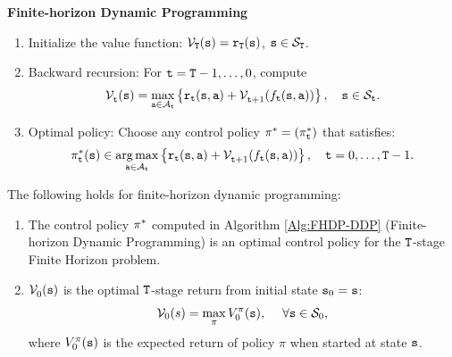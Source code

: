 \begin{algorithm_}
\label{Alg:FHDP-DDP} \textbf{Finite-horizon Dynamic Programming}
\begin{enumerate}
  \item Initialize the value function:
  $\mathcal{V}_{\tt T}({\tt s}) = {{\tt r}_{\tt T}}({\tt s})$,  ${\tt s} \in {\mathcal{S}_{\tt T}}$.
  \item Backward recursion:  For ${\tt t} = {\tt T} - 1, \ldots ,0$, compute
\[\mathcal{V}_{{\tt t}}^{}({\tt s}) = \mathop {\max }\limits_{{\tt a} \in {\mathcal{A}_{{\tt t}}}} \left\{ {{{\tt r}_{{\tt t}}}({\tt s},{\tt a}) + \mathcal{V}_{{\tt t} + 1}^{}({f_{{\tt t}}}({\tt s},{\tt a}))} \right\},\quad     {\tt s} \in {\mathcal{S}_{{\tt t}}}.\]
  \item Optimal policy: Choose any control policy $\pi^*  = ({\pi^* _{{\tt t}}})$ that satisfies:
\[\pi^* _{{\tt t}}({\tt s}) \in \mathop {\arg \max }\limits_{{\tt a} \in {\mathcal{A}_{{\tt t}}}} \left\{ {{{\tt r}_{{\tt t}}}({\tt s},{\tt a}) + \mathcal{V}_{{\tt t} + 1}^{}({f_{{\tt t}}}({\tt s},{\tt a}))} \right\},\quad {\tt t} = 0, \ldots ,{\tt T} - 1.\]
\end{enumerate}
\end{algorithm_}

\begin{proposition}
The following holds for finite-horizon dynamic programming:
\begin{enumerate}
  \item
The control policy $\pi^* $ computed in Algorithm
\ref{Alg:FHDP-DDP} (Finite-horizon Dynamic Programming) is an optimal control policy for the
${\tt T}$-stage Finite Horizon problem.
  \item $\mathcal{V}_0^{}({\tt s})$ is the optimal ${\tt T}$-stage return from initial state ${{\tt s}_0} = {\tt s}$:
\[{\mathcal{V}_0}(s) = \mathop {\max }\limits_\pi  {V^\pi_0}({\tt s}),\;\quad \forall {\tt s} \in {\mathcal{S}_0},\]
where $V^\pi_0({\tt s})$ is the expected return of policy $\pi$
when started at state ${\tt s}$.
\end{enumerate}
\end{proposition}

